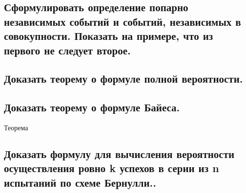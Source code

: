 \subsection{Сформулировать определение попарно независимых событий и событий, независимых в совокупности. Показать на примере, что из первого не следует второе.}



\subsection{Доказать теорему о формуле полной вероятности.}



\subsection{Доказать теорему о формуле Байеса.}

Теорема

\subsection{Доказать формулу для вычисления вероятности осуществления ровно k успехов в серии из n испытаний по схеме Бернулли..}
